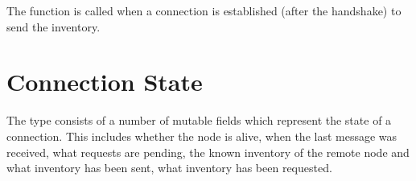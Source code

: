 
The function {} is called when a connection is established (after the handshake)
to send the inventory.

\section{Connection State}

The type {} consists of a number of mutable fields
which represent the state of a connection.
This includes whether the node is alive,
when the last message was received,
what requests are pending,
the known inventory of the remote node
and what inventory has been sent, what inventory has been requested.






